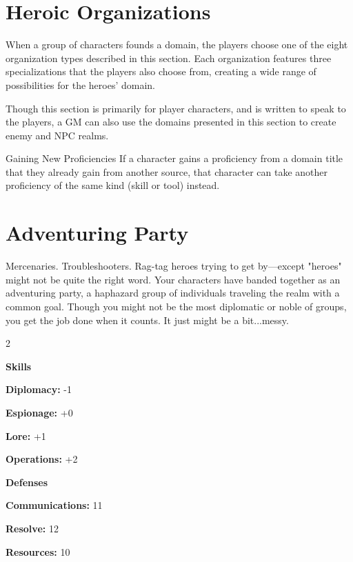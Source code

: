 \documentclass[10pt,a4paper,twoside,bg=print,twocolumn,openany,nodeprecatedcode]{dndbook}
\begin{document}
\section{Heroic Organizations}
When a group of characters founds a domain, the players choose one of the eight organization types described in this section. Each organization features three specializations that the players also choose from, creating a wide range of possibilities for the heroes' domain.

Though this section is primarily for player characters, and is written to speak to the players, a GM can also use the domains presented in this section to create enemy and NPC realms.

\begin{DndSidebar}[float=!b]{Gaining New Proficiencies}
If a character gains a proficiency from a domain title that they already gain from another source, that character can take another proficiency of the same kind (skill or tool) instead.



\end{DndSidebar}

\section{Adventuring Party}
Mercenaries. Troubleshooters. Rag-tag heroes trying to get by—except "heroes" might not be quite the right word. Your characters have banded together as an adventuring party, a haphazard group of individuals traveling the realm with a common goal. Though you might not be the most diplomatic or noble of groups, you get the job done when it counts. It just might be a bit...messy.


\begin{itemize}
\begin{multicols}{2}
\item \textbf{Skills}
\item \textbf{Diplomacy:} -1
\item \textbf{Espionage:} +0
\item \textbf{Lore:} +1
\item \textbf{Operations:} +2
\item \textbf{Defenses}
\item \textbf{Communications:} 11
\item \textbf{Resolve:} 12
\item \textbf{Resources:} 10
\end{multicols}

\end{itemize}
\end{document}
